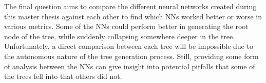 The final question aims to compare the different neural networks created during this master thesis against each other to find which NNs worked better or worse in various metrics.
Some of the NNs could perform better in generating the root node of the tree, while suddenly collapsing somewhere deeper in the tree.
Unfortunately, a direct comparison between each tree will be impossible due to the autonomous nature of the tree generation process.
Still, providing some form of analysis between the NNs can give insight into potential pitfalls that some of the trees fell into that others did not.




